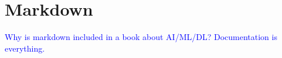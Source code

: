 \section{Markdown}

\textcolor{blue}{Why is markdown included in a book about AI/ML/DL? Documentation is everything.}